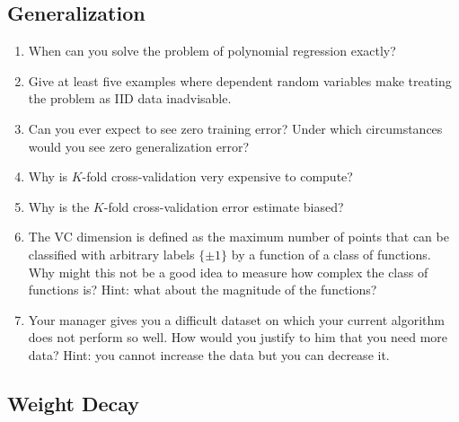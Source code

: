 \documentclass{article}
\begin{document}
\subsection{Generalization}

\begin{enumerate}
\item When can you solve the problem of polynomial regression exactly?

\item Give at least five examples where dependent random variables make treating the problem as IID data inadvisable.

\item Can you ever expect to see zero training error? Under which circumstances would you see zero generalization error?

\item Why is $K$-fold cross-validation very expensive to compute?

\item Why is the $K$-fold cross-validation error estimate biased?

\item The VC dimension is defined as the maximum number of points that can be classified with arbitrary labels $\{\pm 1\}$ by a function of a class of functions. Why might this not be a good idea to measure how complex the class of functions is? Hint: what about the magnitude of the functions?

\item Your manager gives you a difficult dataset on which your current algorithm does not perform so well. How would you justify to him that you need more data? Hint: you cannot increase the data but you can decrease it.
\end{enumerate}

\subsection{Weight Decay}
\end{document}
